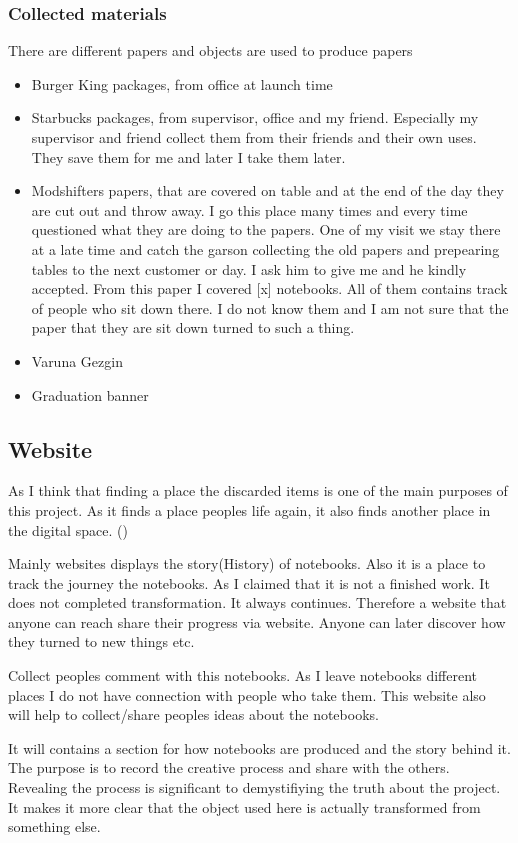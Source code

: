 \subsubsection{Collected materials}
There are different papers and objects are used to produce papers
\begin{itemize}
\item Burger King packages, from office at launch time
\item Starbucks packages, from supervisor, office and my friend. Especially my supervisor and friend collect them from their friends and their own uses. They save them for me and later I take them later. 
\item Modshifters papers, that are covered on table and at the end of the day they are cut out and throw away. I go this place many times and every time questioned what they are doing to the papers. One of my visit we stay there at a late time and catch the garson collecting the old papers and prepearing tables to the next customer or day. I ask him to give me and he kindly accepted. From this paper I covered [x] notebooks. All of them contains track of people who sit down there. I do not know them and I am not sure that the paper that they are sit down turned to such a thing. 
\item Varuna Gezgin
\item Graduation banner
\end{itemize}

\subsection{Website}
As I think that finding a place the discarded items is one of the main purposes of this project. As it finds a place peoples life again, it also finds another place in the digital space. ()

Mainly websites displays the story(History) of notebooks. Also it is a place to track the journey the notebooks. As I claimed that it is not a finished work. It does not completed transformation. It always continues. Therefore a website that anyone can reach share their progress via website. Anyone can later discover how they turned to new things etc. 

Collect peoples comment with this notebooks. As I leave notebooks different places I do not have connection with people who take them. This website also will help to collect/share peoples ideas about the notebooks.

It will contains a section for how notebooks are produced and the story behind it. The purpose is to record the creative process and share with the others. Revealing the process is significant to demystifiying the truth about the project. It makes it more clear that the object used here is actually transformed from something else. 

